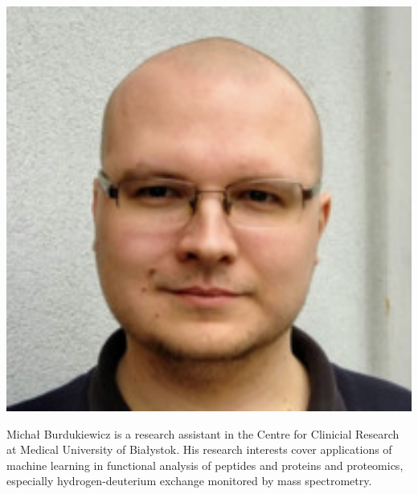 \documentclass[]{MathAppl18}
\begin{document}
\begin{minipage}{0.2\textwidth}
        \includegraphics[width=1\textwidth]{Figures/michal.jpeg}
\end{minipage}
\hspace{0.01\textwidth}
\begin{minipage}{0.7\textwidth}
Michał Burdukiewicz is a research assistant in the Centre for Clinicial Research at Medical University of Bia\l{}ystok. His research interests cover applications of machine learning in functional analysis of peptides and proteins and proteomics, especially hydrogen-deuterium exchange monitored by mass spectrometry.
\end{minipage}

\Koniec
\end{document}
